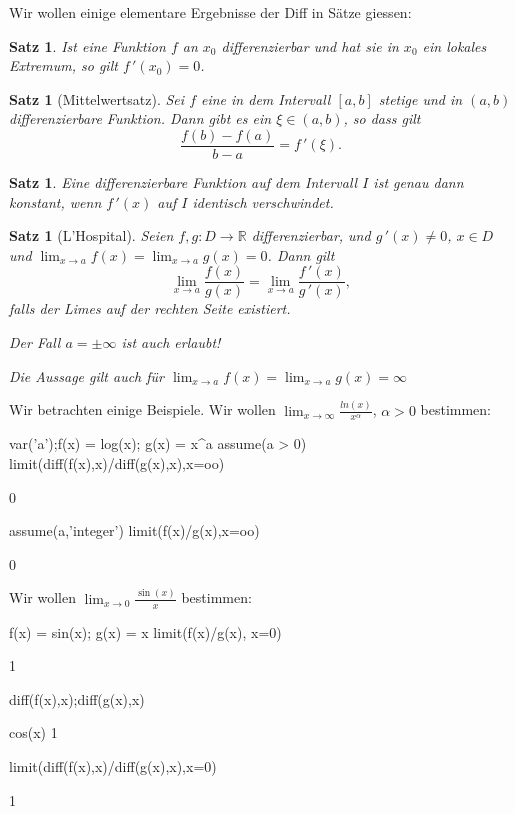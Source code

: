 \documentclass[fontsize=12pt,paper=a4,twoside,bibtotoc,idxtotoc,
liststotoc,pagesize,BCOR1.2cm,DIV15,chapterprefix,pagesize=pdftex]{scrbook}
\theoremstyle{plain}
\newtheorem{sz}[equation]{Satz}
\theoremstyle{definition}
\theoremstyle{remark}
\begin{document}
Wir wollen einige elementare Ergebnisse der Diff in Sätze giessen:
\begin{sz}
Ist eine Funktion $f$ an $x_0$ differenzierbar und hat sie in $x_0$ ein
lokales Extremum, so gilt $f\,'(x_0)=0$.
\end{sz}
\begin{sz}[Mittelwertsatz]
Sei $f$ eine in dem Intervall $[a,b]$ stetige
und in $(a,b)$ differenzierbare Funktion. Dann gibt es ein $\xi \in
(a,b)$, so dass gilt
\[ \frac{f(b)-f(a)}{b-a}= f\,'(\xi). \]  
\end{sz}
\begin{sz}
Eine differenzierbare Funktion auf dem Intervall $I$ ist genau
dann konstant, wenn $f\,'(x)$ auf $I$ identisch verschwindet.
\end{sz}
\begin{sz}[L'Hospital]
Seien $f,g: D \rightarrow \mathbb{R}$
differenzierbar, und $g\,'(x) \neq 0$, $x \in D$ und 
$\lim_{x \rightarrow a} f(x) = \lim_{x \rightarrow a} g(x)= 0$. Dann gilt
\[ \lim_{x \rightarrow a} \frac{f(x)}{g(x)} =  \lim_{x \rightarrow a}
\frac{f\,'(x)}{g\,'(x)}, \]
falls der Limes auf der rechten Seite existiert.

Der Fall $a=\pm\infty$ ist auch erlaubt!

Die Aussage gilt auch für $\lim_{x \rightarrow a} f(x)=\lim_{x \rightarrow a} g(x)= \infty$ 
\end{sz}
Wir betrachten einige Beispiele. Wir wollen $ \lim_{x \rightarrow \infty} \frac{ln(x)}{x^\alpha}$, $\alpha >0$ bestimmen:
\begin{sagein}
var('a');f(x) = log(x); g(x) = x^a
assume(a > 0)
limit(diff(f(x),x)/diff(g(x),x),x=oo)
\end{sagein}
\begin{sage}
  0
\end{sage}
\begin{sagein}
assume(a,'integer')
limit(f(x)/g(x),x=oo)
\end{sagein}
\begin{sage}
  0
\end{sage}
Wir wollen $\lim_{x \rightarrow 0} \frac{\sin(x)}{x}$ bestimmen:
\begin{sagein}
f(x) = sin(x); g(x) = x 
limit(f(x)/g(x), x=0)
\end{sagein}
\begin{sage}
  1
\end{sage}
\begin{sagein}
diff(f(x),x);diff(g(x),x)
\end{sagein}
\begin{sage}
cos(x) 
1
\end{sage}
\begin{sagein}
limit(diff(f(x),x)/diff(g(x),x),x=0)
\end{sagein}
\begin{sage}
1
\end{sage}
\end{document}
